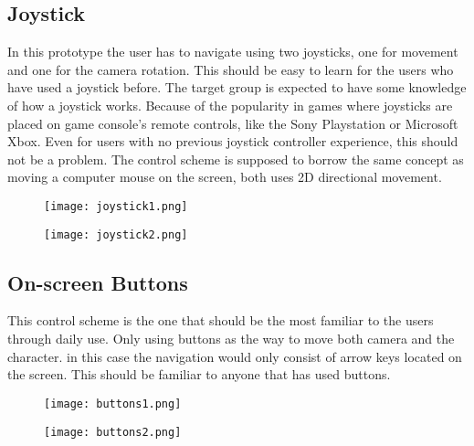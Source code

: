 \subsection{Joystick}
In this prototype the user has to navigate using two joysticks, one for movement and one for the camera rotation. This should be easy to learn for the users who have used a joystick before. The target group is expected to have some knowledge of how a joystick works. Because of the popularity in games where joysticks are placed on game console's remote controls, like the Sony Playstation or Microsoft Xbox. Even for users with no previous joystick controller experience, this should not be a problem. The control scheme is supposed to borrow the same concept as moving a computer mouse on the screen, both uses 2D directional movement\cite{JRaskin}.

\begin{figure}[H]
\centering
\begin{minipage}{.5\textwidth}
  \centering
  \texttt{[image: joystick1.png]}
\end{minipage}%
\begin{minipage}{.5\textwidth}
  \centering
  \texttt{[image: joystick2.png]}
\end{minipage}
  \label{fig:joystickSketch}

\end{figure}

\subsection{On-screen Buttons}
This control scheme is the one that should be the most familiar to the users through daily use. Only using buttons as the way to move both camera and the character. in this case the navigation would only consist of arrow keys located on the screen. This should be familiar to anyone that has used buttons. 

\begin{figure}[H]
\centering
\begin{minipage}{.5\textwidth}
  \centering
  \texttt{[image: buttons1.png]}
\end{minipage}%
\begin{minipage}{.5\textwidth}
  \centering
  \texttt{[image: buttons2.png]}
\end{minipage}
  \label{fig:buttonSketch}
\end{figure}

